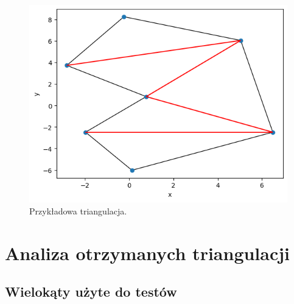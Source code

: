 \documentclass[11pt]{scrartcl}
\begin{document}
    \begin{figure}[H]
        \centering
        \includegraphics[width=0.8\linewidth]{3_4.png}
        \caption{Przykładowa triangulacja.}
    \end{figure}

    \section{Analiza otrzymanych triangulacji}
    \subsection{Wielokąty użyte do testów}
\end{document}
